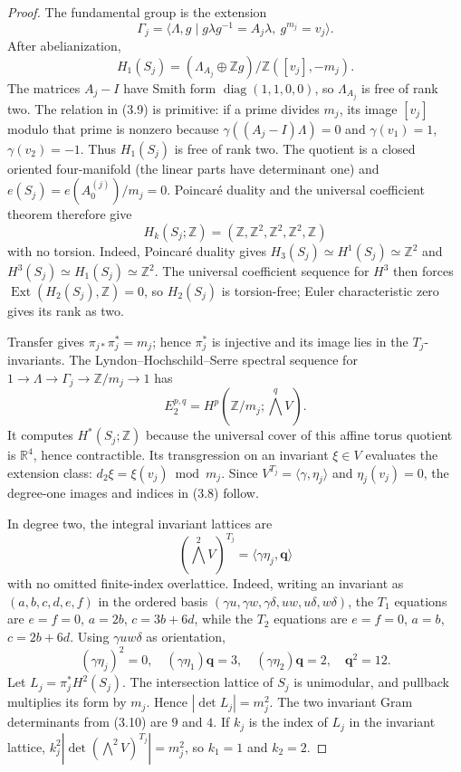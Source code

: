 \begin{proof}
The fundamental group is the extension
\[
\Gamma_j=\langle\Lambda,g\mid
g\lambda g^{-1}=A_j\lambda,\ g^{m_j}=v_j\rangle .
\]
After abelianization,
\[
H_1(S_j)=
(\Lambda_{A_j}\oplus\mathbb Zg)/
\mathbb Z([v_j],-m_j).
\tag{3.9}
\]
The matrices $A_j-I$ have Smith form $\operatorname{diag}(1,1,0,0)$,
so $\Lambda_{A_j}$ is free of rank two.  The relation in (3.9) is
primitive: if a prime divides $m_j$, its image $[v_j]$ modulo that prime is
nonzero because $\gamma((A_j-I)\Lambda)=0$ and
$\gamma(v_1)=1$, $\gamma(v_2)=-1$.  Thus $H_1(S_j)$ is free of rank two.
The quotient is a closed oriented four-manifold (the linear parts have
determinant one) and
$e(S_j)=e(A_0^{(j)})/m_j=0$.  Poincar\'e duality and the universal
coefficient theorem therefore give
\[
H_k(S_j;\mathbb Z)=(\mathbb Z,\mathbb Z^2,
\mathbb Z^2,\mathbb Z^2,\mathbb Z)
\]
with no torsion.
Indeed, Poincar\'e duality gives
$H_3(S_j)\simeq H^1(S_j)\simeq\mathbb Z^2$ and
$H^3(S_j)\simeq H_1(S_j)\simeq\mathbb Z^2$.  The universal coefficient
sequence for $H^3$ then forces
$\operatorname{Ext}(H_2(S_j),\mathbb Z)=0$, so $H_2(S_j)$ is torsion-free;
Euler characteristic zero gives its rank as two.

Transfer gives $\pi_{j*}\pi_j^*=m_j$; hence $\pi_j^*$ is injective and
its image lies in the $T_j$-invariants.  The
Lyndon--Hochschild--Serre spectral sequence for
$1\to\Lambda\to\Gamma_j\to\mathbb Z/m_j\to1$
\cite[Chapter~VII, \S6]{Brown1982} has
\[
E_2^{p,q}=H^p(\mathbb Z/m_j;\textstyle\bigwedge^qV).
\]
It computes $H^*(S_j;\mathbb Z)$ because the universal cover of this affine
torus quotient is $\mathbb R^4$, hence contractible.
Its transgression on an invariant $\xi\in V$ evaluates the extension
class: $d_2\xi=\xi(v_j)\bmod m_j$.  Since
$V^{T_j}=\langle\gamma,\eta_j\rangle$ and
$\eta_j(v_j)=0$, the degree-one images and indices in (3.8) follow.

In degree two, the integral invariant lattices are
\[
(\textstyle\bigwedge^2V)^{T_j}
=\langle\gamma\eta_j,\mathbf q\rangle
\]
with no omitted finite-index overlattice.  Indeed, writing an invariant as
$(a,b,c,d,e,f)$ in the ordered basis
$(\gamma u,\gamma w,\gamma\delta,uw,u\delta,w\delta)$,
the $T_1$ equations are
$e=f=0$, $a=2b$, $c=3b+6d$, while the $T_2$ equations are
$e=f=0$, $a=b$, $c=2b+6d$.  Using $\gamma u w\delta$ as orientation,
\[
(\gamma\eta_j)^2=0,\quad
(\gamma\eta_1)\mathbf q=3,\quad
(\gamma\eta_2)\mathbf q=2,\quad
\mathbf q^2=12.
\tag{3.10}
\]
Let $L_j=\pi_j^*H^2(S_j)$.  The intersection lattice of $S_j$ is
unimodular, and pullback multiplies its form by $m_j$.  Hence
$|\det L_j|=m_j^2$.  The two invariant Gram determinants from (3.10) are
$9$ and $4$.  If $k_j$ is the index of $L_j$ in the invariant lattice,
$k_j^2|\det(\bigwedge^2V)^{T_j}|=m_j^2$, so $k_1=1$ and $k_2=2$.


\end{proof}
